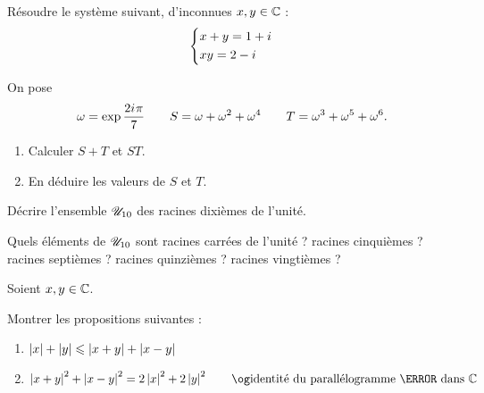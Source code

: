 \begin{exo}
Résoudre le système suivant, d'inconnues \(x,y\in\mathbb{C}\) : \[\begin{dcases}x+y=1+i\mkern1mu \\ xy=2-i\mkern1mu\end{dcases}\]
\end{exo}

\begin{corr}
\end{corr}

\begin{exo}[CCP 2016]
On pose \[\omega=\exp\dfrac{2i\mkern1mu\pi}{7}\qquad S=\omega+\omega^2+\omega^4\qquad T=\omega^3+\omega^5+\omega^6.\]

\begin{enumerate}
\item Calculer \(S+T\) et \(ST\). \\

\item En déduire les valeurs de \(S\) et \(T\).
\end{enumerate}
\end{exo}

\begin{corr}
\end{corr}

\begin{exo}
Décrire l'ensemble \(\mathscr{U}_{10}\) des racines dixièmes de l'unité.

Quels éléments de \(\mathscr{U}_{10}\) sont racines carrées de l'unité ? racines cinquièmes ? racines septièmes ? racines quinzièmes ? racines vingtièmes ?
\end{exo}

\begin{corr}
\end{corr}

\begin{exo}
Soient \(x,y\in\mathbb{C}\).

Montrer les propositions suivantes :

\begin{enumerate}
\item \(\left\lvert x\right\rvert+\left\lvert y\right\rvert\leqslant\left\lvert x+y\right\rvert+\left\lvert x-y\right\rvert\) \\

\item \(\abs{x+y}^2+\abs{x-y}^2=2\abs{x}^2+2\abs{y}^2\qquad\text{\guillemets{identité du parallélogramme} dans }\C\)
\end{enumerate}
\end{exo}

